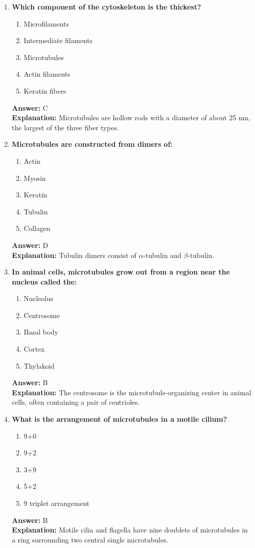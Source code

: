 \documentclass[11pt, a4paper]{article}
\begin{document}
\begin{enumerate}[leftmargin=*, label=\arabic*.]
\item \textbf{Which component of the cytoskeleton is the thickest?}
\begin{enumerate}[label=\Alph*.]
\item Microfilaments
\item Intermediate filaments
\item Microtubules
\item Actin filaments
\item Keratin fibers
\end{enumerate}
\textbf{Answer:} C \\
\textbf{Explanation:} Microtubules are hollow rods with a diameter of about 25 nm, the largest of the three fiber types.

\item \textbf{Microtubules are constructed from dimers of:}
\begin{enumerate}[label=\Alph*.]
\item Actin
\item Myosin
\item Keratin
\item Tubulin
\item Collagen
\end{enumerate}
\textbf{Answer:} D \\
\textbf{Explanation:} Tubulin dimers consist of $\alpha$-tubulin and $\beta$-tubulin.

\item \textbf{In animal cells, microtubules grow out from a region near the nucleus called the:}
\begin{enumerate}[label=\Alph*.]
\item Nucleolus
\item Centrosome
\item Basal body
\item Cortex
\item Thylakoid
\end{enumerate}
\textbf{Answer:} B \\
\textbf{Explanation:} The centrosome is the microtubule-organizing center in animal cells, often containing a pair of centrioles.

\item \textbf{What is the arrangement of microtubules in a motile cilium?}
\begin{enumerate}[label=\Alph*.]
\item 9+0
\item 9+2
\item 3+9
\item 5+2
\item 9 triplet arrangement
\end{enumerate}
\textbf{Answer:} B \\
\textbf{Explanation:} Motile cilia and flagella have nine doublets of microtubules in a ring surrounding two central single microtubules.


\end{enumerate}
\end{document}
